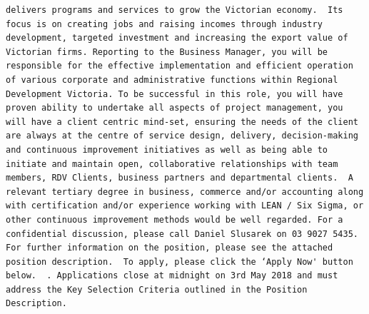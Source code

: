 \documentclass[11pt,a4paper,]{article}
\begin{document}
\begin{verbatim}
delivers programs and services to grow the Victorian economy.  Its focus is on creating jobs and raising incomes through industry development, targeted investment and increasing the export value of Victorian firms. Reporting to the Business Manager, you will be responsible for the effective implementation and efficient operation of various corporate and administrative functions within Regional Development Victoria. To be successful in this role, you will have proven ability to undertake all aspects of project management, you will have a client centric mind-set, ensuring the needs of the client are always at the centre of service design, delivery, decision-making and continuous improvement initiatives as well as being able to initiate and maintain open, collaborative relationships with team members, RDV Clients, business partners and departmental clients.  A relevant tertiary degree in business, commerce and/or accounting along with certification and/or experience working with LEAN / Six Sigma, or other continuous improvement methods would be well regarded. For a confidential discussion, please call Daniel Slusarek on 03 9027 5435. For further information on the position, please see the attached position description.  To apply, please click the ‘Apply Now' button below.  . Applications close at midnight on 3rd May 2018 and must address the Key Selection Criteria outlined in the Position Description.

\end{verbatim}
\end{document}
